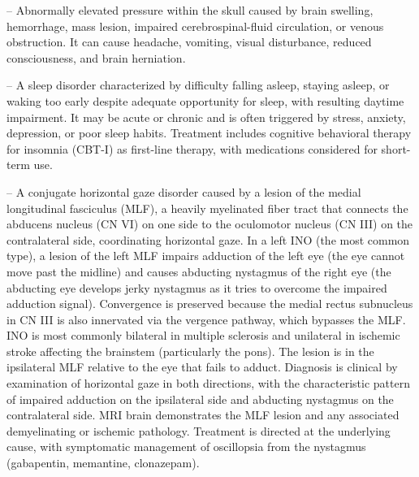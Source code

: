 -- Abnormally elevated pressure within the skull caused by brain swelling, hemorrhage, mass lesion, impaired cerebrospinal-fluid circulation, or venous obstruction. It can cause headache, vomiting, visual disturbance, reduced consciousness, and brain herniation.

-- A sleep disorder characterized by difficulty falling asleep, staying asleep, or waking too early despite adequate opportunity for sleep, with resulting daytime impairment. It may be acute or chronic and is often triggered by stress, anxiety, depression, or poor sleep habits. Treatment includes cognitive behavioral therapy for insomnia (CBT-I) as first-line therapy, with medications considered for short-term use.

-- A conjugate horizontal gaze disorder caused by a lesion of the medial longitudinal fasciculus (MLF), a heavily myelinated fiber tract that connects the abducens nucleus (CN VI) on one side to the oculomotor nucleus (CN III) on the contralateral side, coordinating horizontal gaze. In a left INO (the most common type), a lesion of the left MLF impairs adduction of the left eye (the eye cannot move past the midline) and causes abducting nystagmus of the right eye (the abducting eye develops jerky nystagmus as it tries to overcome the impaired adduction signal). Convergence is preserved because the medial rectus subnucleus in CN III is also innervated via the vergence pathway, which bypasses the MLF. INO is most commonly bilateral in multiple sclerosis and unilateral in ischemic stroke affecting the brainstem (particularly the pons). The lesion is in the ipsilateral MLF relative to the eye that fails to adduct. Diagnosis is clinical by examination of horizontal gaze in both directions, with the characteristic pattern of impaired adduction on the ipsilateral side and abducting nystagmus on the contralateral side. MRI brain demonstrates the MLF lesion and any associated demyelinating or ischemic pathology. Treatment is directed at the underlying cause, with symptomatic management of oscillopsia from the nystagmus (gabapentin, memantine, clonazepam).

